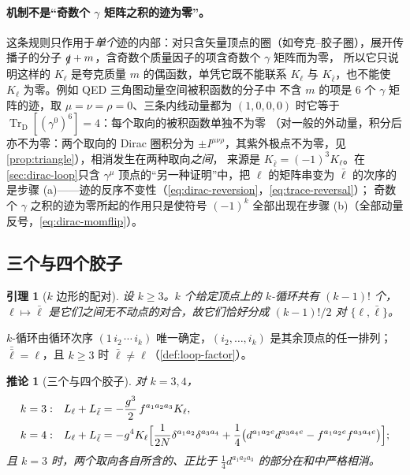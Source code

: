 \documentclass[UTF8,a4paper,11pt,fontset=fandol]{ctexart}
\makeatletter
\theoremstyle{cplain}
\newtheorem{lemma}[theorem]{引理}
\newtheorem{corollary}[theorem]{推论}
\theoremstyle{cdefinition}
\theoremstyle{cremark}
\renewcommand{\proofname}{证明}
\renewenvironment{proof}[1][\proofname]{\par\pushQED{\qed}\normalfont\topsep6\p@\@plus6\p@\relax
  \trivlist\item[\hskip\labelsep\itshape #1\hspace{0.5em}]\ignorespaces}{\popQED\endtrivlist\@endpefalse}
\numberwithin{equation}{section}
\newcommand{\TrD}{\operatorname{Tr}_{\mathrm{D}}}   %
\newcommand{\sla}[1]{\slashed{#1}}                  %
\makeatother
\begin{document}
\paragraph{机制不是“奇数个 $\gamma$ 矩阵之积的迹为零”。}这条规则只作用于\emph{单个}迹的内部：对只含矢量顶点的圈（如夸克--胶子圈），展开传播子的分子 $\sla q+m$，含奇数个质量因子的项含奇数个 $\gamma$ 矩阵而为零，
所以它只说明这样的 $K_\ell$ 是夸克质量 $m$ 的偶函数，单凭它既不能联系 $K_\ell$ 与 $K_{\bar\ell}$，也不能使 $K_\ell$ 为零。例如 QED 三角图动量空间被积函数的分子中
不含 $m$ 的项是 $6$ 个 $\gamma$ 矩阵的迹，取 $\mu=\nu=\rho=0$、三条内线动量都为 $(1,0,0,0)$ 时它等于 $\TrD[(\gamma^0)^6]=4$：每个取向的被积函数单独不为零
（对一般的外动量，积分后亦不为零：两个取向的 Dirac 圈积分为 $\pm I^{\mu\nu\rho}$，其紫外极点不为零，见\cref{prop:triangle}），相消发生在两种取向\emph{之间}，
来源是 $K_{\bar\ell}=(-1)^3K_\ell$。在\cref{sec:dirac-loop}只含 $\gamma^\mu$ 顶点的“另一种证明”中，把 $\ell$ 的矩阵串变为 $\bar\ell$ 的次序的是步骤 (a)——迹的反序不变性（\cref{eq:dirac-reversion}，\cref{eq:trace-reversal}）；
奇数个 $\gamma$ 之积的迹为零所起的作用只是使符号 $(-1)^k$ 全部出现在步骤 (b)（全部动量反号，\cref{eq:dirac-momflip}）。

\subsection{三个与四个胶子}\label{sec:thmI-three-four}

\begin{lemma}[$k$ 边形的配对]\label{lem:thmI-pairs}
设 $k\ge3$。$k$ 个给定顶点上的 $k$-循环共有 $(k-1)!$ 个，$\ell\mapsto\bar\ell$ 是它们之间无不动点的对合，故它们恰好分成 $(k-1)!/2$ 对 $\{\ell,\bar\ell\}$。
\end{lemma}

\begin{proof}
$k$-循环由循环次序 $(1\,i_2\,\cdots\,i_k)$ 唯一确定，$(i_2,\dots,i_k)$ 是其余顶点的任一排列；$\bar{\bar\ell}=\ell$，且 $k\ge3$ 时 $\bar\ell\neq\ell$（\cref{def:loop-factor}）。
\end{proof}

\begin{corollary}[三个与四个胶子]\label{cor:three-four}
对 $k=3,4$，
\begin{align*}
k=3:&\quad L_\ell+L_{\bar\ell}=-\frac{g^3}{2}\,f^{a_1a_2a_3}K_\ell,\\
k=4:&\quad L_\ell+L_{\bar\ell}=-g^4K_\ell\Bigl[\frac{1}{2N}\delta^{a_1a_2}\delta^{a_3a_4}+\frac14\bigl(d^{a_1a_2e}d^{a_3a_4e}-f^{a_1a_2e}f^{a_3a_4e}\bigr)\Bigr];
\end{align*}
且 $k=3$ 时，两个取向各自所含的、正比于 $\tfrac14d^{a_1a_2a_3}$ 的部分在和中严格相消。
\end{corollary}
\end{document}
